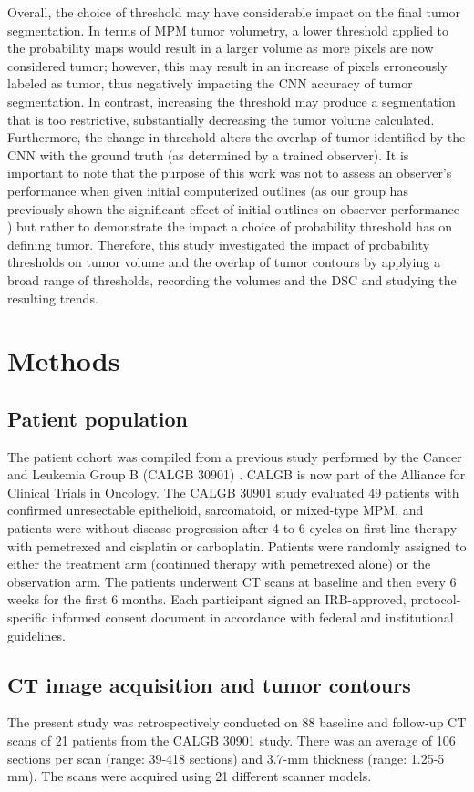 \documentclass{article}
\begin{document}
Overall, the choice of threshold may have considerable impact on the final tumor segmentation. In terms of MPM tumor volumetry, a lower threshold applied to the probability maps would result in a larger volume as more pixels are now considered tumor; however, this may result in an increase of pixels erroneously labeled as tumor, thus negatively impacting the CNN accuracy of tumor segmentation. In contrast, increasing the threshold may produce a segmentation that is too restrictive, substantially decreasing the tumor volume calculated. Furthermore, the change in threshold alters the overlap of tumor identified by the CNN with the ground truth (as determined by a trained observer). It is important to note that the purpose of this work was not to assess an observer's performance when given initial computerized outlines (as our group has previously shown the significant effect of initial outlines on observer performance \cite{Sensakovic}) but rather to demonstrate the impact a choice of probability threshold has on defining tumor. Therefore, this study investigated the impact of probability thresholds on tumor volume and the overlap of tumor contours by applying a broad range of thresholds, recording the volumes and the DSC and studying the resulting trends.


\section{Methods} \label{sect:methods}
\subsection{Patient population}
The patient cohort was compiled from a previous study performed by the Cancer and Leukemia Group B (CALGB 30901) \cite{Dudek}. CALGB is now part of the Alliance for Clinical Trials in Oncology. The CALGB 30901 study evaluated 49 patients with confirmed unresectable epithelioid, sarcomatoid, or mixed-type MPM, and patients were without disease progression after 4 to 6 cycles on first-line therapy with pemetrexed and cisplatin or carboplatin. Patients were randomly assigned to either the treatment arm (continued therapy with pemetrexed alone) or the observation arm. The patients underwent CT scans at baseline and then every 6 weeks for the first 6 months. Each participant signed an IRB-approved, protocol-specific informed consent document in accordance with federal and institutional guidelines.

\subsection{CT image acquisition and tumor contours}
The present study was retrospectively conducted on 88 baseline and follow-up CT scans of 21 patients from the CALGB 30901 study. There was an average of 106 sections per scan (range: 39-418 sections) and 3.7-mm thickness (range: 1.25-5 mm). The scans were acquired using 21 different scanner models.
\end{document}
